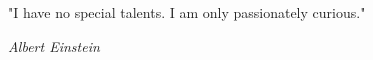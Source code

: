 \begin{shadequote}
"I have no special talents. I am only passionately curious." \par\emph{Albert Einstein}
\end{shadequote}




